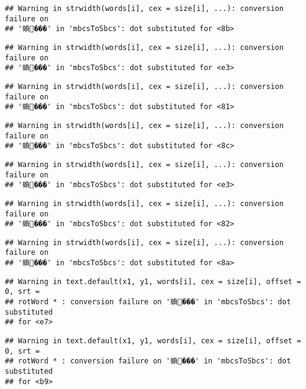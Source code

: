 \documentclass[]{article}
\begin{document}
\begin{verbatim}
## Warning in strwidth(words[i], cex = size[i], ...): conversion failure on
## '蝜���' in 'mbcsToSbcs': dot substituted for <8b>
\end{verbatim}

\begin{verbatim}
## Warning in strwidth(words[i], cex = size[i], ...): conversion failure on
## '蝜���' in 'mbcsToSbcs': dot substituted for <e3>
\end{verbatim}

\begin{verbatim}
## Warning in strwidth(words[i], cex = size[i], ...): conversion failure on
## '蝜���' in 'mbcsToSbcs': dot substituted for <81>
\end{verbatim}

\begin{verbatim}
## Warning in strwidth(words[i], cex = size[i], ...): conversion failure on
## '蝜���' in 'mbcsToSbcs': dot substituted for <8c>
\end{verbatim}

\begin{verbatim}
## Warning in strwidth(words[i], cex = size[i], ...): conversion failure on
## '蝜���' in 'mbcsToSbcs': dot substituted for <e3>
\end{verbatim}

\begin{verbatim}
## Warning in strwidth(words[i], cex = size[i], ...): conversion failure on
## '蝜���' in 'mbcsToSbcs': dot substituted for <82>
\end{verbatim}

\begin{verbatim}
## Warning in strwidth(words[i], cex = size[i], ...): conversion failure on
## '蝜���' in 'mbcsToSbcs': dot substituted for <8a>
\end{verbatim}

\begin{verbatim}
## Warning in text.default(x1, y1, words[i], cex = size[i], offset = 0, srt =
## rotWord * : conversion failure on '蝜���' in 'mbcsToSbcs': dot substituted
## for <e7>
\end{verbatim}

\begin{verbatim}
## Warning in text.default(x1, y1, words[i], cex = size[i], offset = 0, srt =
## rotWord * : conversion failure on '蝜���' in 'mbcsToSbcs': dot substituted
## for <b9>
\end{verbatim}
\end{document}
